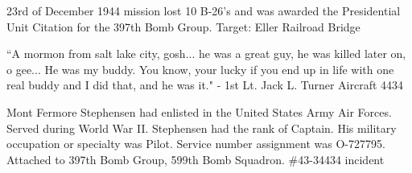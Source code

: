 \documentclass{article}
\begin{document}
\begin{multicols}{3}
23rd of December 1944 mission lost 10 B-26's and was awarded the Presidential Unit Citation for the 397th Bomb Group. Target: Eller Railroad Bridge

\closearticle



``A mormon from salt lake city, gosh... he was a great guy, he was killed later on, o gee... He was my buddy. You know, your lucky if you end up in life with one real buddy and I did that, and he was it." - 1st Lt. Jack L. Turner
Aircraft 4434

% 

% 
% 

\begin{window} Mont Fermore Stephensen had enlisted in the United States Army Air Forces. Served during World War II. Stephensen had the rank of Captain. His military occupation or specialty was Pilot. Service number assignment was O-727795. Attached to 397th Bomb Group, 599th Bomb Squadron. \#43-34434 incident
%
\end{window}

\closearticle



\end{multicols}
\end{document}
